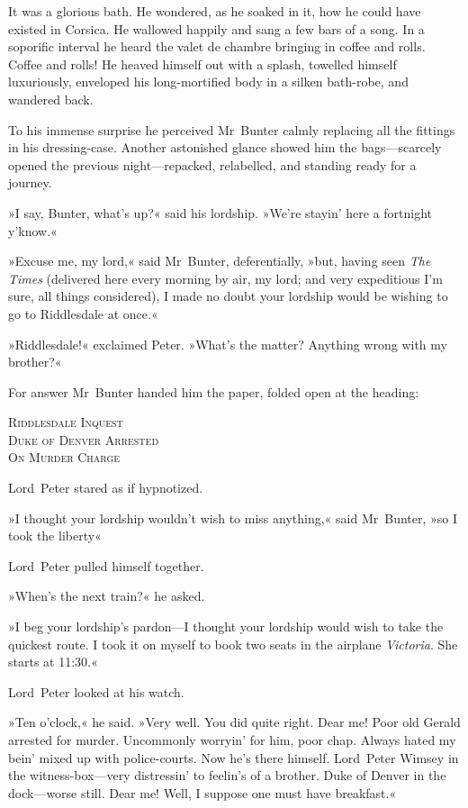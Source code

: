 It was a glorious bath. He wondered, as he soaked in it, how he could have existed in Corsica. He wallowed happily and sang a few bars of a song. In a soporific interval he heard the valet de chambre bringing in coffee and rolls. Coffee and rolls! He heaved himself out with a splash, towelled himself luxuriously, enveloped his long-mortified body in a silken bath-robe, and wandered back.

To his immense surprise he perceived Mr~Bunter calmly replacing all the fittings in his dressing-case. Another astonished glance showed him the bags—scarcely opened the previous night—repacked, relabelled, and standing ready for a journey.

»I say, Bunter, what's up?« said his lordship. »We're stayin' here a fortnight y'know.«

»Excuse me, my lord,« said Mr~Bunter, deferentially, »but, having seen \textit{The Times} (delivered here every morning by air, my lord; and very expeditious I'm sure, all things considered), I made no doubt your lordship would be wishing to go to Riddlesdale at once.«

»Riddlesdale!« exclaimed Peter. »What's the matter? Anything wrong with my brother?«

For answer Mr~Bunter handed him the paper, folded open at the heading:
\begin{center}
\textsc{Riddlesdale Inquest\\
Duke of Denver Arrested\\
On Murder Charge}
\end{center}


Lord~Peter stared as if hypnotized.

»I thought your lordship wouldn't wish to miss anything,« said Mr~Bunter, »so I took the liberty\longdash«

Lord~Peter pulled himself together.

»When's the next train?« he asked.

»I beg your lordship's pardon—I thought your lordship would wish to take the quickest route. I took it on myself to book two seats in the airplane \textit{Victoria}. She starts at 11:30.«

Lord~Peter looked at his watch.

»Ten o'clock,« he said. »Very well. You did quite right. Dear me! Poor old Gerald arrested for murder. Uncommonly worryin' for him, poor chap.  Always hated my bein' mixed up with police-courts. Now he's there himself. Lord~Peter Wimsey in the witness-box—very distressin' to feelin's of a brother. Duke of Denver in the dock—worse still. Dear me! Well, I suppose one must have breakfast.«

